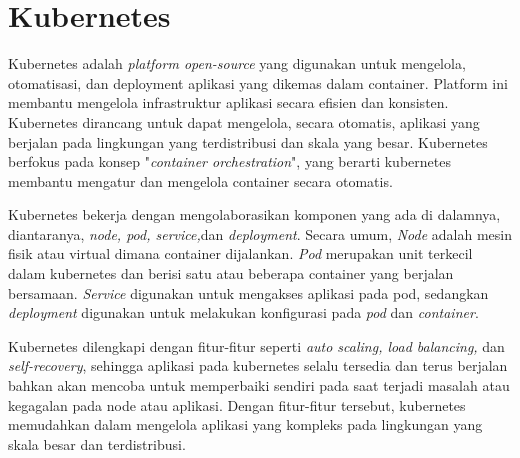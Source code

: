 \section{Kubernetes}

Kubernetes adalah \textit{platform open-source} yang digunakan untuk mengelola, otomatisasi, dan deployment aplikasi yang dikemas dalam container. Platform ini membantu mengelola infrastruktur aplikasi secara efisien dan konsisten. Kubernetes dirancang untuk dapat mengelola, secara otomatis, aplikasi yang berjalan pada lingkungan yang terdistribusi dan skala yang besar. Kubernetes berfokus pada konsep "\textit{container orchestration}", yang berarti kubernetes membantu mengatur dan mengelola container secara otomatis.

Kubernetes bekerja dengan mengolaborasikan komponen yang ada di dalamnya, diantaranya, \textit{node, pod, service,}dan \textit{deployment}. Secara umum, \textit{Node} adalah mesin fisik atau virtual dimana container dijalankan. \textit{Pod} merupakan unit terkecil dalam kubernetes dan berisi satu atau beberapa container yang berjalan bersamaan. \textit{Service} digunakan untuk mengakses aplikasi pada pod, sedangkan \textit{deployment} digunakan untuk melakukan konfigurasi pada \textit{pod} dan \textit{container}.

Kubernetes dilengkapi dengan fitur-fitur seperti \textit{auto scaling, load balancing,} dan \textit{self-recovery}, sehingga aplikasi pada kubernetes selalu tersedia dan terus berjalan bahkan akan mencoba untuk memperbaiki sendiri pada saat terjadi masalah atau kegagalan pada node atau aplikasi. Dengan fitur-fitur tersebut, kubernetes memudahkan dalam mengelola aplikasi yang kompleks pada lingkungan yang skala besar dan terdistribusi.
